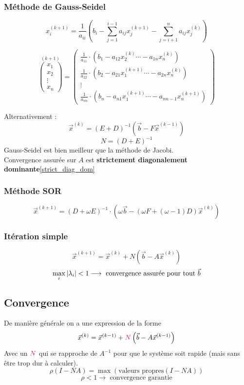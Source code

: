 \documentclass[resume]{subfiles}
\begin{document}
\subsubsection{Méthode de Gauss-Seidel}
$$x_i^{(k+1)}=\frac{1}{a_{ii}}\left(b_i-\sum_{j=1}^{i-1}a_{ij}x_j^{(k+1)}-\sum_{j=i+1}^{n}a_{ij}x_j^{(k)}\right)$$
\begin{small}
$$\boxed{\overset{(k+1)}{\begin{pmatrix}x_1\\x_2\\\vdots\\x_n\end{pmatrix}}=\begin{pmatrix}
\frac{1}{a_{11}}\cdot(b_1-a_{12}x_2^{(k)} \cdots -a_{1n}x_n^{(k)})\\
\frac{1}{a_{22}}\cdot(b_2-a_{21}x_1^{(k+1)} \cdots -a_{2n}x_n^{(k)})\\
\vdots\\
\frac{1}{a_{nn}}\cdot(b_n-a_{n1}x_1^{(k+1)} \cdots -a_{nn-1}x_n^{(k+1)})
\end{pmatrix}}$$
\end{small}
Alternativement :
$$\boxed{\vec{x}^{(k)}=(E+D)^{-1}\left(\vec{b}-F\vec{x}^{(k-1)}\right)}$$
$$N=(D+E)^{-1}$$
Gauss-Seidel est bien meilleur que la méthode de Jacobi.\\
Convergence assurée sur $A$ est \textbf{strictement diagonalement dominante}\ref{strict_diag_dom}

\subsubsection{Méthode SOR}
$$\vec{x}^{(k+1)}=(D+\omega E)^{-1}\cdot \left(\omega \vec{b}-(\omega F+(\omega-1)D)\vec{x}^{(k)}\right)$$
\subsubsection{Itération simple}
$$\vec{x}^{(k+1)}=\vec{x}^{(k)}+N\left(\vec{b}-A\vec{x}^{(k)}\right)$$
$$\max_i\abs{\lambda_i}<1\longrightarrow\text{ convergence assurée pour tout }\vec{b}$$
\subsection{Convergence}
De manière générale on a une expression de la forme
$$\vec{x}^{(k)}=\vec{x}^{(k-1)}+\textcolor{OrangeRed}{N}\left(\vec{b}-A\vec{x}^{(k-1)}\right)$$
Avec un $\textcolor{OrangeRed}{N}$ qui se rapproche de $A^{-1}$ pour que le système soit rapide (mais sans être trop dur à calculer).\\
$$\boxed{\rho(I-NA)=\max\left(\text{valeurs propres}(I-NA)\right)}$$
$$\rho < 1\longrightarrow\text{ convergence garantie}$$
\end{document}
